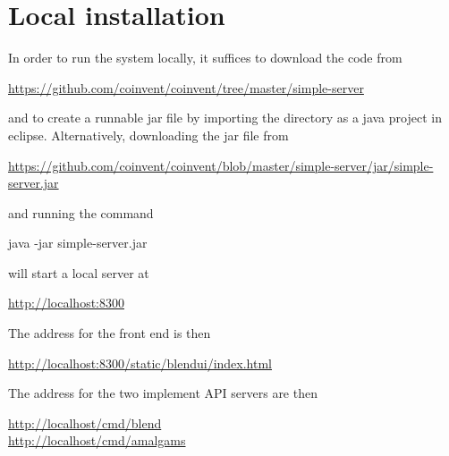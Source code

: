 \section{Local installation} \label{sec:inst}

In order to run the system locally, it suffices to download the code from \mbox{}\\
\begin{center}
\url{https://github.com/coinvent/coinvent/tree/master/simple-server}
\end{center}
and to create a runnable jar file by importing the directory as a java project in eclipse. Alternatively, downloading the jar file from \mbox{}\\
\begin{center}
\url{https://github.com/coinvent/coinvent/blob/master/simple-server/jar/simple-server.jar}
\end{center}
and running the command
\begin{center}
java -jar simple-server.jar
\end{center}
\noindent will start a local server at \mbox{}\\
\begin{center}
\url{http://localhost:8300}
\end{center}
The address for the front end is then\mbox{}\\
\begin{center}
\url{http://localhost:8300/static/blendui/index.html}
\end{center}
The address for the two implement API servers are then\mbox{}\\
\begin{center}
\url{http://localhost/cmd/blend}\mbox{}\\
\url{http://localhost/cmd/amalgams}\mbox{}
\end{center}